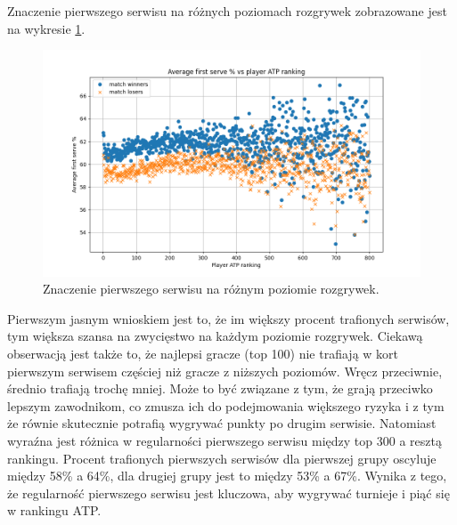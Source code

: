 \documentclass[12pt, a4paper]{article}
\begin{document}
Znaczenie pierwszego serwisu na różnych poziomach rozgrywek zobrazowane jest na wykresie \ref{fig:serve_vs_ranking}.
\begin{figure}[h]
    \includegraphics[width=\textwidth]{figures/serve_vs_ranking.png}
    \caption{Znaczenie pierwszego serwisu na różnym poziomie rozgrywek.}
    \label{fig:serve_vs_ranking}
\end{figure}
Pierwszym jasnym wnioskiem jest to, że im większy procent trafionych serwisów, tym większa szansa na zwycięstwo na każdym poziomie rozgrywek. Ciekawą obserwacją jest także to, że najlepsi gracze (top 100) nie trafiają w kort pierwszym serwisem częściej niż gracze z niższych poziomów. Wręcz przeciwnie, średnio trafiają trochę mniej. Może to być związane z tym, że grają przeciwko lepszym zawodnikom, co zmusza ich do podejmowania większego ryzyka i z tym że równie skutecznie potrafią wygrywać punkty po drugim serwisie. Natomiast wyraźna jest różnica w regularności pierwszego serwisu między top 300 a resztą rankingu. Procent trafionych pierwszych serwisów dla pierwszej grupy oscyluje między 58\% a 64\%, dla drugiej grupy jest to między 53\% a 67\%. Wynika z tego, że regularność pierwszego serwisu jest kluczowa, aby wygrywać turnieje i piąć się w rankingu ATP.
\end{document}
